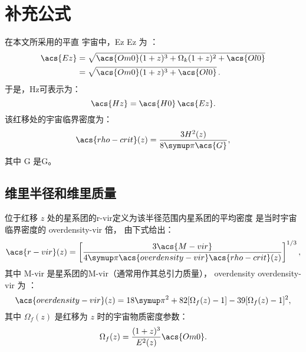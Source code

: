 
\chapter{补充公式}
\label{app:formulas}


在本文所采用的平直 \lcdm 宇宙中，\acl{Ez} \acs{Ez} 为 \cite{hogg1999}：
\begin{align}
  \label{eq:Ez}
  \acs{Ez}
    & = \sqrt{\acs{Om0} (1+z)^3 + \Omega_k (1+z)^2 + \acs{Ol0}}  \\
    & = \sqrt{\acs{Om0} (1+z)^3 + \acs{Ol0}} \, .
\end{align}
于是，\acl{Hz}可表示为：
\begin{equation}
  \label{eq:hubble-z}
  \acs{Hz} = \acs{H0} \, \acs{Ez} .
\end{equation}
该红移处的宇宙临界密度为：
\begin{equation}
  \label{eq:rho-crit}
  \acs{rho-crit}(z) = \frac{3 H^2(z)}{8 \Cpi \acs{G}} ,
\end{equation}
其中 \acs{G} 是\acl{G}。


\section{维里半径和维里质量}

位于红移 $z$ 处的星系团的\acf{r-vir}定义为该半径范围内星系团的平均密度
是当时宇宙临界密度的 \acs{overdensity-vir} 倍，
由下式给出：
\begin{equation}
  \label{eq:radius-virial}
  \acs{r-vir}(z) = \left[
    \frac{3 \acs{M-vir}}{4\Cpi \acs{overdensity-vir} \acs{rho-crit}(z)}
  \right]^{1/3},
\end{equation}
其中 \acs{M-vir} 是星系团的\acl{M-vir}（通常用作其总引力质量），
\acf{overdensity} \acs{overdensity-vir} 为 \cite{bryan1998}：
\begin{equation}
  \label{eq:delta-vir}
  \acs{overdensity-vir}(z)
    = 18\Cpi^2 + 82 [\Omega_f(z) - 1] - 39 [\Omega_f(z) - 1]^2 ,
\end{equation}
其中 $\Omega_f(z)$ 是红移为 $z$ 时的宇宙物质密度参数：
\begin{equation}
  \label{eq:omega-f}
  \Omega_f(z) = \frac{(1+z)^3}{E^2(z)} \acs{Om0} .
\end{equation}


